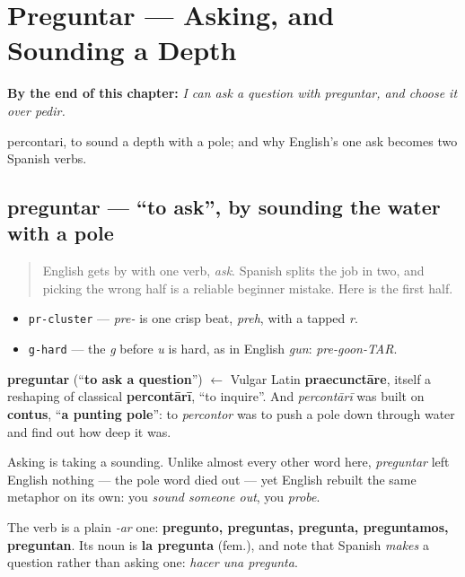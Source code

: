 
\chapter{Preguntar — Asking, and Sounding a Depth}
\label{ch:spanish-preguntar}

\begin{chapteropening}
\textbf{By the end of this chapter:} \emph{I can ask a question with preguntar, and choose it over pedir.}

percontari, to sound a depth with a pole; and why English's one ask becomes two Spanish verbs.
\end{chapteropening}

\section[preguntar]{preguntar — \textquotedblleft{}to ask\textquotedblright{}, by sounding the water with a pole}

\label{lesson:ES-C35-preguntar}



\begin{quote}
English gets by with one verb, \emph{ask}. Spanish splits the job in two, and picking the wrong half is a reliable beginner mistake. Here is the first half.
\end{quote}

\begin{sounds}
\begin{itemize}
\raggedright
  \item \texttt{pr-cluster} — \emph{pre-} is one crisp beat, \emph{preh}, with a tapped \emph{r}.
  \item \texttt{g-hard} — the \emph{g} before \emph{u} is hard, as in English \emph{gun}: \emph{pre-goon-TAR}.
\end{itemize}
\end{sounds}

\begin{cousinweb}
\textbf{preguntar} (\textquotedblleft{}\textbf{to ask a question}\textquotedblright{}) $\leftarrow$ Vulgar Latin \textbf{praecunctāre}, itself a reshaping of classical \textbf{percontārī}, \textquotedblleft{}to inquire\textquotedblright{}. And \emph{percontārī} was built on \textbf{contus}, \textquotedblleft{}\textbf{a punting pole}\textquotedblright{}: to \emph{percontor} was to push a pole down through water and find out how deep it was.

Asking is taking a sounding. Unlike almost every other word here, \emph{preguntar} left English nothing — the pole word died out — yet English rebuilt the same metaphor on its own: you \emph{sound someone out}, you \emph{probe}.

The verb is a plain \emph{-ar} one: \textbf{pregunto, preguntas, pregunta, preguntamos, preguntan}. Its noun is \textbf{la pregunta} (fem.), and note that Spanish \emph{makes} a question rather than asking one: \emph{hacer una pregunta}.
\end{cousinweb}

